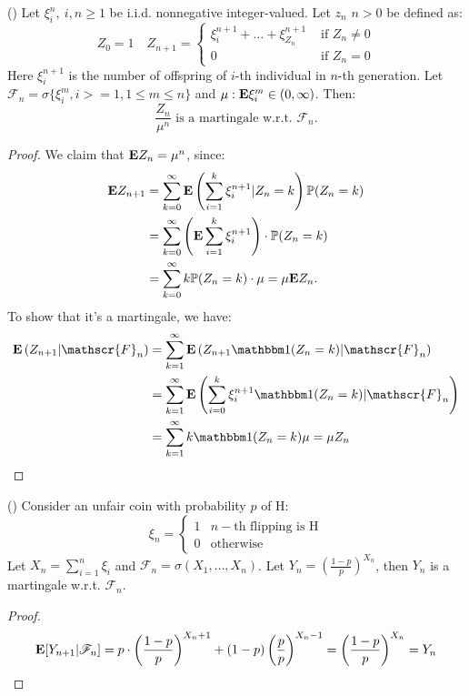 \documentclass[../main/main.tex]{subfiles}
\begin{document}
\begin{example}()
	Let $\xi_i^{n},\ i,n \geq 1$ be i.i.d. nonnegative integer-valued. Let $z_n$ $n>0$ be defined as: \[
		Z_0 = 1 \quad Z_{n+1} = \begin{cases}
			\xi_i^{n+1} + \ldots + \xi_{Z_n}^{n+1} & \text{ if } Z_n \neq 0 \\
			0                                      & \text{ if }Z_n = 0
		\end{cases}
	\]
	Here $\xi_i^{n+1}$ is the number of offspring of $i$-th individual in $n$-th generation. Let $\mathscr{F}_n = \sigma \{\xi_i^{m}, i>= 1, 1 \leq m \leq n\}$ and $\mu : \text{\textbf{E}} \xi^{m}_i \in(0,\infty)$. Then: \[
		\frac{Z_n}{\mu^{n}}\text{ is a martingale w.r.t. }\mathscr{F}_n.
	\]
\end{example}
\begin{proof}
	We claim that $\text{\textbf{E}} Z_n = \mu^{n}$, since:
	\begin{align*}
		\text{\textbf{E}} Z_{n+1} & = \sum\limits_{k=0}^{\infty}\text{\textbf{E}} \left( \sum\limits_{i=1}^{k}\xi_i^{n+1}| Z_n = k \right) \mathbb{P}(Z_n = k) \\
		           & = \sum\limits_{k=0}^{\infty} \left( \text{\textbf{E}} \sum\limits_{i=1}^{k}\xi_i^{n+1} \right) \cdot \mathbb{P} (Z_n = k)  \\
		           & = \sum\limits_{k=0}^{\infty} k \mathbb{P}(Z_n = k) \cdot \mu = \mu \text{\textbf{E}} Z_n.
	\end{align*}
	To show that it's a martingale, we have:
	\begin{align*}
		\E \left( Z_{n+1}| \mathscr{F}_n \right) & =\sum\limits_{k=1}^{\infty}\E \left( Z_{n+1}\ind(Z_n = k) | \mathscr{F}_n\right)                              \\
		                                         & = \sum\limits_{k=1}^{\infty} \E \left( \sum\limits_{i=0}^{k} \xi_i^{n+1}\ind (Z_n = k)| \mathscr{F}_n \right) \\
		                                         & = \sum\limits_{k=1}^{\infty} k \ind(Z_n = k) \mu = \mu Z_n                                                    \\
	\end{align*}
\end{proof}

\begin{example}()
	Consider an unfair coin with probability $p$ of H: \[
		\xi_n = \begin{cases}
			1 & n-\text{th flipping is H} \\
			0 & \text{otherwise}
		\end{cases} \]
	Let $X_n = \sum\limits_{i=1}^{n}\xi_i$ and $\mathscr{F}_n = \sigma(X_1, \ldots , X_n)$. Let $Y_n = \left( \frac{1-p}{p} \right)^{X_n}$, then $Y_n$ is a martingale w.r.t. $\mathscr{F}_n$.
\end{example}
\begin{proof}
	\[
		\text{\textbf{E}} [ Y_{n+1} | \mathscr{F}_n] = p \cdot \left( \frac{1-p}{p} \right)^{X_{n}+1} + (1-p) \left( \frac{p}{p} \right)^{X_{n}-1} = \left( \frac{1-p}{p} \right)^{X_n} = Y_n
	\]
\end{proof}
\end{document}
